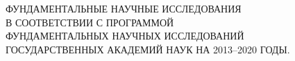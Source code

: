  \begin{center}
 {\large

 ФУНДАМЕНТАЛЬНЫЕ НАУЧНЫЕ ИССЛЕДОВАНИЯ\\[4pt]
 В СООТВЕТСТВИИ С ПРОГРАММОЙ  \\[4pt]
 ФУНДАМЕНТАЛЬНЫХ НАУЧНЫХ ИССЛЕДОВАНИЙ \\[4pt]
 ГОСУДАРСТВЕННЫХ АКАДЕМИЙ НАУК НА 2013–2020 ГОДЫ.}
 \\[12pt]
\end{center}
  